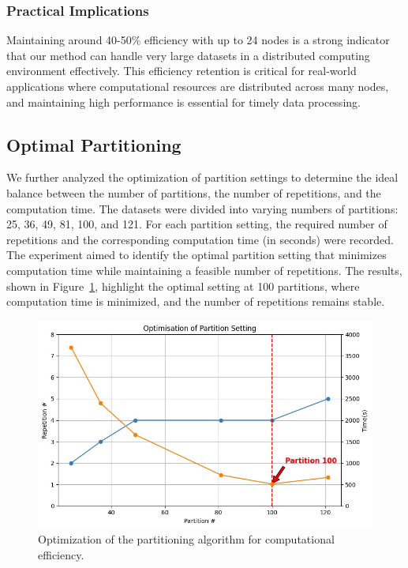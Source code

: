 \documentclass[journal]{IEEEtran}
\begin{document}
\subsubsection{Practical Implications}
Maintaining around 40-50\% efficiency with up to 24 nodes is a strong indicator that our method can handle very large datasets in a distributed computing environment effectively. This efficiency retention is critical for real-world applications where computational resources are distributed across many nodes, and maintaining high performance is essential for timely data processing.

\subsection{Optimal Partitioning}

We further analyzed the optimization of partition settings to determine the ideal balance between the number of partitions, the number of repetitions, and the computation time. The datasets were divided into varying numbers of partitions: 25, 36, 49, 81, 100, and 121. For each partition setting, the required number of repetitions and the corresponding computation time (in seconds) were recorded. The experiment aimed to identify the optimal partition setting that minimizes computation time while maintaining a feasible number of repetitions. The results, shown in Figure~\ref{fig:optimisation}, highlight the optimal setting at 100 partitions, where computation time is minimized, and the number of repetitions remains stable.

\begin{figure}[htbp]
  \centering
  \includegraphics[width=0.8\linewidth]{optimisation.jpg}
  \caption{Optimization of the partitioning algorithm for computational efficiency.}
  \label{fig:optimisation}
\end{figure}
\end{document}
